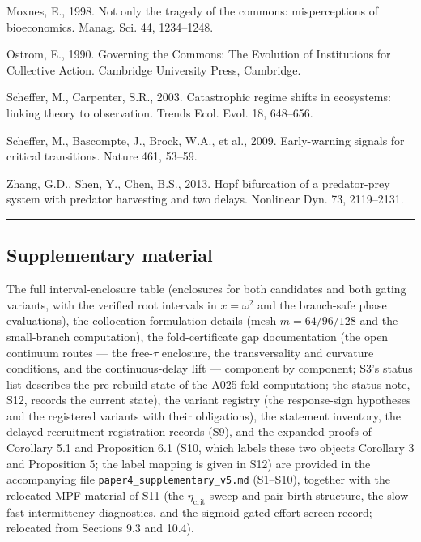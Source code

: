 \documentclass[11pt]{article}
\begin{document}
Moxnes, E., 1998. Not only the tragedy of the commons: misperceptions of
bioeconomics. Manag. Sci. 44, 1234--1248.

Ostrom, E., 1990. Governing the Commons: The Evolution of Institutions
for Collective Action. Cambridge University Press, Cambridge.

Scheffer, M., Carpenter, S.R., 2003. Catastrophic regime shifts in
ecosystems: linking theory to observation. Trends Ecol. Evol. 18,
648--656.

Scheffer, M., Bascompte, J., Brock, W.A., et al., 2009. Early-warning
signals for critical transitions. Nature 461, 53--59.

Zhang, G.D., Shen, Y., Chen, B.S., 2013. Hopf bifurcation of a
predator-prey system with predator harvesting and two delays. Nonlinear
Dyn. 73, 2119--2131.

\begin{center}\rule{0.5\linewidth}{0.5pt}\end{center}

\subsection{Supplementary material}\label{supplementary-material}

The full interval-enclosure table (enclosures for both candidates and
both gating variants, with the verified root intervals in
\(x = \omega^2\) and the branch-safe phase evaluations), the collocation
formulation details (mesh \(m = 64/96/128\) and the small-branch
computation), the fold-certificate gap documentation (the open continuum
routes --- the free-\(\tau\) enclosure, the transversality and curvature
conditions, and the continuous-delay lift --- component by component;
S3's status list describes the pre-rebuild state of the A025 fold
computation; the status note, S12, records the current state), the
variant registry (the response-sign hypotheses and the registered
variants with their obligations), the statement inventory, the
delayed-recruitment registration records (S9), and the expanded proofs
of Corollary 5.1 and Proposition 6.1 (S10, which labels these two
objects Corollary 3 and Proposition 5; the label mapping is given in
S12) are provided in the accompanying file
\texttt{paper4\_supplementary\_v5.md} (S1--S10), together with the
relocated MPF material of S11 (the \(\eta_{\mathrm{crit}}\) sweep and
pair-birth structure, the slow-fast intermittency diagnostics, and the
sigmoid-gated effort screen record; relocated from Sections 9.3 and
10.4).
\end{document}
